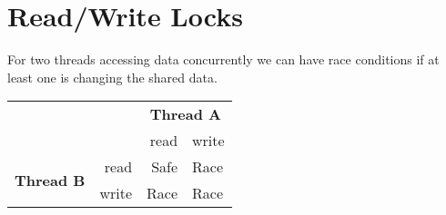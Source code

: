 \documentclass{report}
\begin{document}
    \section*{Read/Write Locks}
        For two threads accessing data concurrently we can have race conditions if at least one is changing the shared data.
        \begin{center}
            \begin{tabular}{c r r l}
                && \multicolumn{2}{c}{\textbf{Thread A}} \\
                && read & write \\
                \multirow{2}{*}{\textbf{Thread B}}&read & Safe & Race \\
                &write & Race & Race \\
            \end{tabular}
        \end{center}
        \begin{minipage}[t]{0.4 \textwidth}
        \end{minipage}
        \begin{minipage}[t]{0.2 \textwidth}
            \
        \end{minipage}
        \begin{minipage}[t]{0.4 \textwidth}
        \end{minipage}
        \begin{itemize}
        \end{itemize}
    
\end{document}
